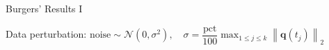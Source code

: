 \begin{frame}{Burgers' Results I}

Data perturbation: $\displaystyle\text{noise}\sim\mathcal{N}(0, \sigma^2),\quad \sigma=\dfrac{\text{pct}}{100}\max_{1 \leq j \leq k} \left\| \mathbf{q}(t_j) \right\|_2
$

\vspace{0.8cm}

  \begin{columns}[T,onlytextwidth]  %
      \centering
      \label{fig:left}


      \centering
      \label{fig:right}
  \end{columns}

\end{frame}

